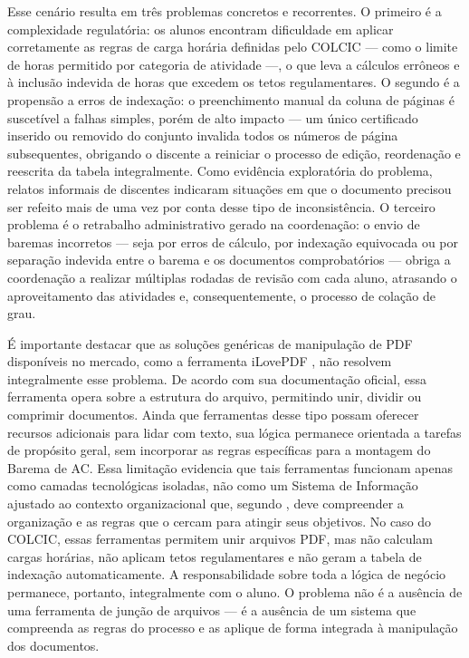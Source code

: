Esse cenário resulta em três problemas concretos e recorrentes. O primeiro é a complexidade regulatória: os alunos encontram dificuldade em aplicar corretamente as regras de carga horária definidas pelo COLCIC — como o limite de horas permitido por categoria de atividade —, o que leva a cálculos errôneos e à inclusão indevida de horas que excedem os tetos regulamentares. O segundo é a propensão a erros de indexação: o preenchimento manual da coluna de páginas é suscetível a falhas simples, porém de alto impacto — um único certificado inserido ou removido do conjunto invalida todos os números de página subsequentes, obrigando o discente a reiniciar o processo de edição, reordenação e reescrita da tabela integralmente. Como evidência exploratória do problema, relatos informais de discentes indicaram situações em que o documento precisou ser refeito mais de uma vez por conta desse tipo de inconsistência. O terceiro problema é o retrabalho administrativo gerado na coordenação: o envio de baremas incorretos — seja por erros de cálculo, por indexação equivocada ou por separação indevida entre o barema e os documentos comprobatórios — obriga a coordenação a realizar múltiplas rodadas de revisão com cada aluno, atrasando o aproveitamento das atividades e, consequentemente, o processo de colação de grau.

É importante destacar que as soluções genéricas de manipulação de PDF disponíveis no mercado, como a ferramenta iLovePDF \cite{ilovepdf2026}, não resolvem integralmente esse problema. De acordo com sua documentação oficial, essa ferramenta opera sobre a estrutura do arquivo, permitindo unir, dividir ou comprimir documentos. Ainda que ferramentas desse tipo possam oferecer recursos adicionais para lidar com texto, sua lógica permanece orientada a tarefas de propósito geral, sem incorporar as regras específicas para a montagem do Barema de AC. Essa limitação evidencia que tais ferramentas funcionam apenas como camadas tecnológicas isoladas, não como um Sistema de Informação ajustado ao contexto organizacional que, segundo \cite{laudon2014}, deve compreender a organização e as regras que o cercam para atingir seus objetivos. No caso do COLCIC, essas ferramentas permitem unir arquivos PDF, mas não calculam cargas horárias, não aplicam tetos regulamentares e não geram a tabela de indexação automaticamente. A responsabilidade sobre toda a lógica de negócio permanece, portanto, integralmente com o aluno. O problema não é a ausência de uma ferramenta de junção de arquivos — é a ausência de um sistema que compreenda as regras do processo e as aplique de forma integrada à manipulação dos documentos.

